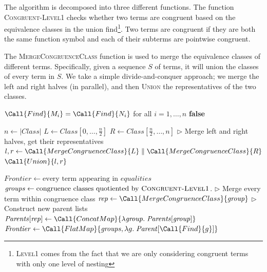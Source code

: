 The algorithm is decomposed into three different functions. The function
\textsc{Congruent-Level1} checks whether two terms are congruent based on the
equivalence classes in the union find\footnote{\textsc{Level1} comes from the
fact that we are only considering congruent terms with only one level of
nesting}. Two terms are congruent if they are both the same function symbol and
each of their subterms are pointwise congruent.

The \textsc{MergeCongruenceClass} function is used to merge the equivalence
classes of different terms. Specifically, given a sequence $S$ of terms, it will
union the classes of every term in $S$. We take a simple divide-and-conquer
approach; we merge the left and right halves (in parallel), and then
\textsc{Union} the representatives of the two classes.

\begin{algorithm}
\begin{algorithmic}[1]
      \State \Return $\Call{Find}{M_i} = \Call{Find}{N_i}$
      for all $i = 1,\ldots,n$ \Else \State \Return \textbf{false} \EndIf
      \EndFunction

      \State {}  \EndIf \State $n \gets |\textit{Class}|$ \State $L \gets
      \mathit{Class}[0,\ldots,\frac{n}{2}]$ \State $R \gets
      \mathit{Class}[\frac{n}{2},\ldots,n]$ \State $\rhd$ Merge left and right
      halves, get their representatives \State $l, r \gets
      \Call{MergeCongruenceClass}{L} \parallel \Call{MergeCongruenceClass}{R}$
      \State \Return $\Call{Union}{l, r}$  \EndFunction

        \State $\mathit{Frontier} \gets \text{every term appearing in } \mathit{equalities}$
          \State $\mathit{groups} \gets \text{congruence classes quotiented by } \textsc{Congruent-Level1}$.
            \State $\rhd$ Merge every term within congruence class
            \State $\mathit{rep} \gets \Call{MergeCongruenceClass}{\mathit{group}}$
            \State $\rhd$ Construct new parent lists
            \State $\mathit{Parents}[\mathit{rep}] \gets \Call{ConcatMap}{\lambda \mathit{group}. \; \mathit{Parents}[\mathit{group}]}$
          \EndParFor
          \State $\mathit{Frontier} \gets \Call{FlatMap}{\mathit{groups}, \lambda g. \; \mathit{Parent}[\Call{Find}{g}] }$
        \EndWhile
    \EndFunction
\end{algorithmic}
\caption{Round-based congruence closure algorithm}
\label{alg:bsp}
\end{algorithm}
